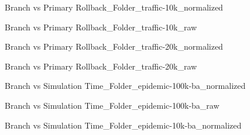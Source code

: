 \newpage
\begin{figure}[H]
\centering

\caption{Branch vs Primary Rollback\_Folder\_traffic-10k\_normalized}
\end{figure}
\vspace{1cm}
\begin{figure}[H]
\centering

\caption{Branch vs Primary Rollback\_Folder\_traffic-10k\_raw}
\end{figure}
\vspace{1cm}
\newpage
\begin{figure}[H]
\centering

\caption{Branch vs Primary Rollback\_Folder\_traffic-20k\_normalized}
\end{figure}
\vspace{1cm}
\begin{figure}[H]
\centering

\caption{Branch vs Primary Rollback\_Folder\_traffic-20k\_raw}
\end{figure}
\vspace{1cm}
\newpage
\begin{figure}[H]
\centering

\caption{Branch vs Simulation Time\_Folder\_epidemic-100k-ba\_normalized}
\end{figure}
\vspace{1cm}
\begin{figure}[H]
\centering

\caption{Branch vs Simulation Time\_Folder\_epidemic-100k-ba\_raw}
\end{figure}
\vspace{1cm}
\newpage
\begin{figure}[H]
\centering

\caption{Branch vs Simulation Time\_Folder\_epidemic-10k-ba\_normalized}
\end{figure}
